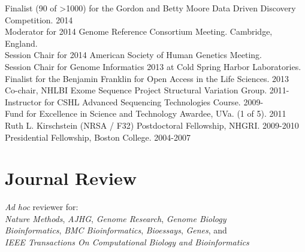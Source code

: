 \documentclass[margin,line]{cv}
\begin{document}
\begin{resume}
    Finalist (90 of \textgreater 1000) for the Gordon and Betty Moore Data Driven Discovery Competition. 2014 \\\vspace{1mm}%
    Moderator for 2014 Genome Reference Consortium Meeting. Cambridge, England. \\\vspace{1mm}%
    Session Chair for 2014 American Society of Human Genetics Meeting. \\\vspace{1mm}%
    Session Chair for Genome Informatics 2013 at Cold Spring Harbor Laboratories. \\\vspace{1mm}%
	Finalist for the Benjamin Franklin for Open Access in the Life Sciences. 2013 \\\vspace{1mm}%
    Co-chair, NHLBI Exome Sequence Project Structural Variation Group. 2011-                           \\\vspace{1mm}%
    Instructor for CSHL Advanced Sequencing Technologies Course. 2009-                                 \\\vspace{1mm}%
    Fund for Excellence in Science and Technology Awardee, UVa. (1 of 5). 2011                         \\\vspace{1mm}%
    Ruth L. Kirschstein (NRSA / F32) Postdoctoral Fellowship, NHGRI. 2009-2010                         \\\vspace{1mm}%
    Presidential Fellowship, Boston College. 2004-2007                                                               %
    
    

    \section{\mysidestyle Journal Review} 
    \textit{Ad hoc} reviewer for:\\ 
        \textit{Nature Methods}, \textit{AJHG}, \textit{Genome Research}, \textit{Genome Biology}\\
	    \textit{Bioinformatics}, \textit{BMC Bioinformatics}, \textit{Bioessays}, \textit{Genes}, and \\
        \textit{IEEE Transactions On Computational Biology and Bioinformatics}
    

\end{resume}
\end{document}
